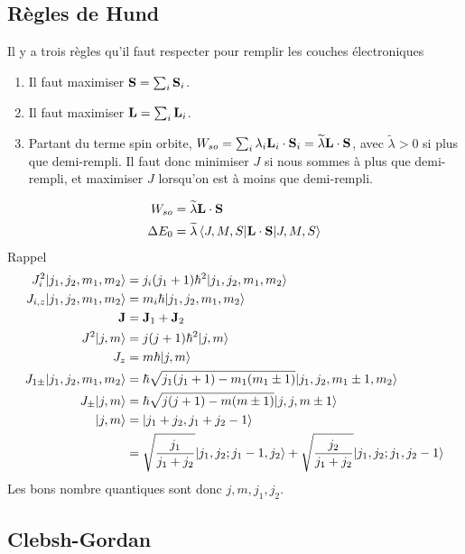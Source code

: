 
\subsection{Règles de Hund} %
\label{sub:Règle de Hund}

Il y a trois règles qu'il faut respecter pour remplir les couches électroniques
\begin{enumerate}
    \item Il faut maximiser $\vb{S}=\sum_i\vb{S}_i$.
    \item Il faut maximiser $\vb{L}=\sum_i\vb{L}_i$.
    \item Partant du terme spin orbite, $W_{so}=\sum_i\lambda_i\vb{L}_i\cdot\vb{S}_i
        =\widetilde{\lambda}\vb{L}\cdot\vb{S}$, avec $\widetilde{\lambda}>0$ si
        plus que demi-rempli. Il faut donc minimiser $J$ si nous sommes à plus
        que demi-rempli, et maximiser $J$ lorsqu'on est à moins que demi-rempli.
\end{enumerate}
\begin{align}
    W_{so}&=\widetilde{\lambda}\vb{L}\cdot\vb{S}\\
    \Delta E_0&=\widetilde{\lambda}\expval{
    J,M,S|\vb{L}\cdot\vb{S}|J,M,S}
\end{align}
Rappel
\begin{align}
    J_i^2|{j_1,j_2,m_1,m_2}\rangle&=j_i(j_1+1)\hbar^2|{j_1,j_2,m_1,m_2}\rangle\\
    J_{i,z}|{j_1,j_2,m_1,m_2}\rangle&=m_i\hbar|{j_1,j_2,m_1,m_2}\rangle\\
    \vb{J}&=\vb{J}_1+\vb{J}_2\\
    J^2|{j,m}\rangle&=j(j+1)\hbar^2|{j,m}\rangle\\
    J_z&=m\hbar|{j,m}\rangle\\
    J_{1\pm}|{j_1,j_2,m_1,m_2}\rangle&=\hbar\sqrt{j_1(j_1+1)-m_1(m_1\pm1)}
    |{j_1,j_2,m_1\pm1,m_2}\rangle\\
    J_{\pm}|{j,m}\rangle&=\hbar\sqrt{j(j+1)-m(m\pm1)}
    |{j,j,m\pm1}\rangle\\
    |{j,m}\rangle&=|{j_1+j_2,j_1+j_2-1}\rangle\\
             &=\sqrt{\frac{j_1}{j_1+j_2}}|{j_1,j_2;j_1-1,j_2}\rangle
             +\sqrt{\frac{j_2}{j_1+j_2}}|{j_1,j_2;j_1,j_2-1}\rangle
\end{align}
Les bons nombre quantiques sont donc $j, m,j_1,j_2$.


\subsection{Clebsh-Gordan} %
\label{sub:Clebsh-Gordan}

